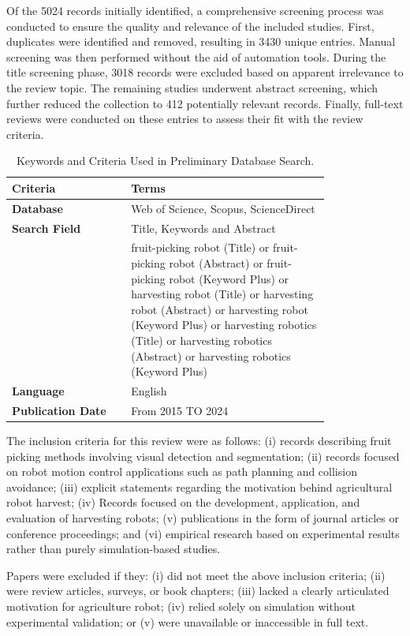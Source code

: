\documentclass[a4paper,fleqn]{cas-dc}
\begin{document}
Of the 5024 records initially identified, a comprehensive screening process was conducted to ensure the quality and relevance of the included studies. First, duplicates were identified and removed, resulting in 3430 unique entries. Manual screening was then performed without the aid of automation tools. During the title screening phase, 3018 records were excluded based on apparent irrelevance to the review topic. The remaining studies underwent abstract screening, which further reduced the collection to 412 potentially relevant records. Finally, full-text reviews were conducted on these entries to assess their fit with the review criteria.

\begin{table}[ht]
\scriptsize
\caption{Keywords and Criteria Used in Preliminary Database Search.} 
\label{tab:keywords} 
\begin{tabular}{p{0.3\linewidth} p{0.5\linewidth}}
\hline
\textbf{Criteria} & \textbf{Terms} \\ \hline
\textbf{Database}  &  Web of Science, Scopus, ScienceDirect \\
\textbf{Search Field} & Title, Keywords and Abstract\\
 & fruit-picking robot (Title) or fruit-picking robot (Abstract) or fruit-picking robot (Keyword Plus) or harvesting robot (Title) or harvesting robot (Abstract) or harvesting robot (Keyword Plus) or harvesting robotics (Title) or harvesting robotics (Abstract) or harvesting robotics (Keyword Plus)\\
\textbf{Language} & English \\
\textbf{Publication Date} & From 2015 TO 2024 \\ \hline 
\end{tabular}
\end{table}

The inclusion criteria for this review were as follows: (i) records describing fruit picking methods involving visual detection and segmentation; (ii) records focused on robot motion control applications such as path planning and collision avoidance; (iii) explicit statements regarding the motivation behind agricultural robot harvest; (iv) Records focused on the development, application, and evaluation of harvesting robots; (v) publications in the form of journal articles or conference proceedings; and (vi) empirical research based on experimental results rather than purely simulation-based studies.

Papers were excluded if they: (i) did not meet the above inclusion criteria; (ii) were review articles, surveys, or book chapters; (iii) lacked a clearly articulated motivation for agriculture robot; (iv) relied solely on simulation without experimental validation; or (v) were unavailable or inaccessible in full text.
\end{document}
